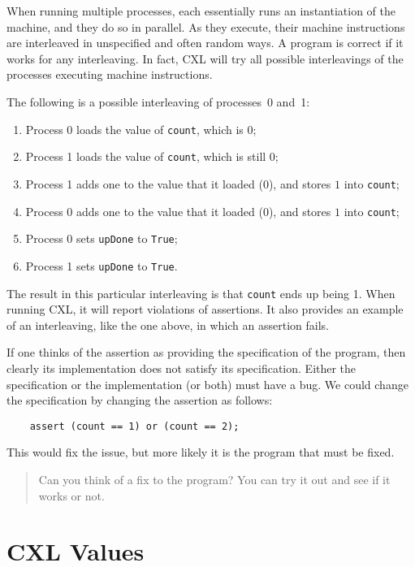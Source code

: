 \documentclass{report}
\newenvironment{code}{
\tcolorbox
}{
\endtcolorbox
}
\begin{document}
When running multiple processes, each essentially runs an instantiation of
the machine, and they do so in parallel.  As they execute, their machine
instructions are interleaved in unspecified and often random ways.
A program is correct if it works for any interleaving.
In fact, CXL will try all possible interleavings of the processes
executing machine instructions.

The following is a possible interleaving of processes~0 and~1:
\begin{enumerate}
\item Process 0 loads the value of \texttt{count}, which is 0;
\item Process 1 loads the value of \texttt{count}, which is still 0;
\item Process 1 adds one to the value that it loaded (0), and
stores $1$ into \texttt{count};
\item Process 0 adds one to the value that it loaded (0), and
stores $1$ into \texttt{count};
\item Process 0 sets \texttt{upDone} to \texttt{True};
\item Process 1 sets \texttt{upDone} to \texttt{True}.
\end{enumerate}

The result in this particular interleaving is that \texttt{count} ends up
being 1.  When running CXL, it will
report violations of assertions.  It also provides an example
of an interleaving, like the one above, in which an assertion fails.

If one thinks of the assertion as providing the specification of the
program, then clearly its implementation does not satisfy its specification.
Either the specification or the implementation (or both) must have a bug.
We could change the specification by changing the assertion as follows:

\begin{code}
\begin{verbatim}
    assert (count == 1) or (count == 2);
\end{verbatim}
\end{code}

This would fix the issue, but more likely it is the program that must
be fixed.

\begin{quote}
Can you think of a fix to the program?  You can try it out and see
if it works or not.
\end{quote}

\chapter{CXL Values}
\label{ch:cxlvalues}
\end{document}
